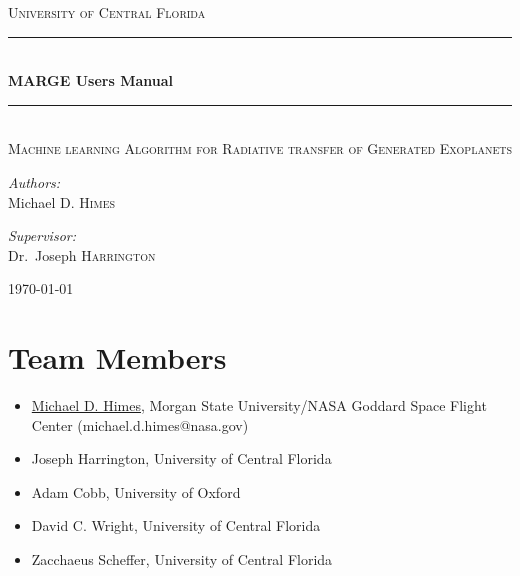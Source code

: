 \documentclass[letterpaper, 12pt]{article}
\begin{document}
\begin{titlepage}
\begin{center}

\textsc{\LARGE University of Central Florida}\\[1.5cm]

\rule{\linewidth}{0.5mm} \\[0.4cm]
{ \huge \bfseries MARGE Users Manual \\[0.4cm] }
\rule{\linewidth}{0.5mm} \\[1.0cm]

\textsc{\Large Machine learning Algorithm for Radiative transfer of Generated Exoplanets}\\[1.5cm]

\noindent
\begin{minipage}{0.4\textwidth}
\begin{flushleft}
\large
\emph{Authors:} \\
Michael D. \textsc{Himes} \\
\end{flushleft}
\end{minipage}%
\begin{minipage}{0.4\textwidth}
\begin{flushright} \large
\emph{Supervisor:} \\
Dr.~Joseph \textsc{Harrington}
\end{flushright}
\end{minipage}
\vfill

{\large \today}

\end{center}
\end{titlepage}

\tableofcontents
\newpage

\section{Team Members}
\label{sec:team}

\begin{itemize}
\item \href{https://github.com/mdhimes/}{Michael D. Himes}, 
                 Morgan State University/NASA Goddard Space Flight Center (michael.d.himes@nasa.gov)
\item Joseph Harrington, University of Central Florida
\item Adam Cobb, University of Oxford
\item David C. Wright, University of Central Florida
\item Zacchaeus Scheffer, University of Central Florida
\end{itemize}
\end{document}
